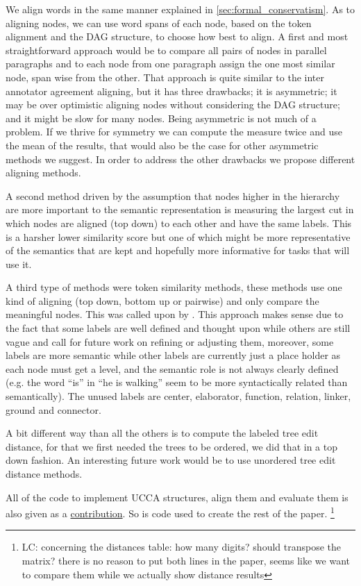 \documentclass[english]{article}
\newcommand{\lc}[1]{\footnote{\color{green}LC: #1}}
\begin{document}
We align words in the same manner explained in \ref{sec:formal_conservatism}.
As to aligning nodes, we can use word spans of each node, based on
the token alignment and the DAG structure, to choose how best to align.
A first and most straightforward approach would be to compare all
pairs of nodes in parallel paragraphs and to each node from one paragraph
assign the one most similar node, span wise from the other. That approach
is quite similar to the inter annotator agreement aligning, but it
has three drawbacks; it is asymmetric; it may be over optimistic aligning
nodes without considering the DAG structure; and it might be
slow for many nodes. Being asymmetric is not much of a problem. If we thrive for symmetry
we can compute the measure twice and use the mean of the results,
that would also be the case for other asymmetric methods we suggest.
In order to address the other drawbacks we propose different aligning methods.

A second method driven by the assumption that nodes higher in the
hierarchy are more important to the semantic representation is measuring
the largest cut in which nodes are aligned (top down) to each other
and have the same labels. This is a harsher lower similarity
score but one of which might be more representative of the semantics
that are kept and hopefully more informative for tasks that will use it.

A third type of methods were token similarity methods, these methods
use one kind of aligning (top down, bottom up or pairwise) and only
compare the meaningful nodes. This was called upon by \cite{sulem2015conceptual}. 
This approach makes sense due to the fact that some labels
are well defined and thought upon while others are still vague and
call for future work on refining or adjusting them, moreover, some
labels are more semantic while other labels are currently just a place
holder as each node must get a level, and the semantic role is not
always clearly defined (e.g. the word ``is'' in ``he is walking''
seem to be more syntactically related than semantically). The unused
labels are center, elaborator, function, relation, linker, ground
and connector.

A bit different way than all the others is to compute the labeled
tree edit distance\cite{zhang1989simple}, for that we first needed
the trees to be ordered, we did that in a top down fashion. An interesting
future work would be to use unordered tree edit distance methods\cite{zhang1992editing}.

All of the code to implement UCCA structures, align them and evaluate
them is also given as a \href{link will be disclosed upon publication}{contribution}.
So is code used to create the rest of the paper.
\lc{concerning the distances table: how many digits? should transpose the matrix? there is no reason to put both lines in the paper, seems like we want to compare them while we actually show distance results}
\end{document}
